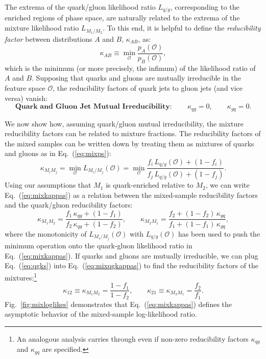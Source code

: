 \documentclass[letterpaper,11pt]{article}
\DeclareRobustCommand{\Fig}[1]{Fig.~\ref{#1}}
\DeclareRobustCommand{\Eq}[1]{Eq.~(\ref{#1})}
\renewcommand{\O}{\mathcal{O}}
\begin{document}
The extrema of the quark/gluon likelihood ratio $L_{q/g}$, corresponding to the enriched regions of phase space, are naturally related to the extrema of the mixture likelihood ratio $L_{M_1/M_2}$.
%
To this end, it is helpful to define the \emph{reducibility factor} between distributions $A$ and $B$, $\kappa_{AB}$, as:
\begin{equation}
\label{eq:kappa}
\kappa_{AB}\equiv\min_{\O}\frac{p_A(\O)}{p_B(\O)},
\end{equation}
which is the minimum (or more precisely, the infimum) of the likelihood ratio of $A$ and $B$.
%
Supposing that quarks and gluons are mutually irreducible in the feature space $\O$, the reducibility factors of quark jets to gluon jets (and vice versa) vanish:
\begin{equation}
\label{eq:qgks}
\textbf{Quark and Gluon Jet Mutual Irreducibility}:\quad\quad\kappa_{qg}=0,\quad\quad\kappa_{gq}=0.
\end{equation}

We now show how, assuming quark/gluon mutual irreducibility, the mixture reducibility factors can be related to mixture fractions.
%
The reducibility factors of the mixed samples can be written down by treating them as mixtures of quarks and gluons as in \Eq{eq:mixps}:
\begin{equation}
\label{eq:mixkappas}
\kappa_{M_iM_j}=\min_{\O} L_{M_i/M_j}(\O)=\min_{\O}\frac{f_i \, L_{q/g}(\O)+(1-f_i)}{f_j \, L_{q/g}(\O)+(1-f_j)}.
\end{equation}
%
Using our assumptions that $M_1$ is quark-enriched relative to $M_2$, we can write \Eq{eq:mixkappas} as a relation between the mixed-sample reducibility factors and the quark/gluon reducibility factors:
\begin{equation}
\label{eq:mixqgkappas}
\kappa_{M_1M_2}=\frac{f_1\,\kappa_{qg}+(1-f_1)}{f_2\,\kappa_{qg}+(1-f_2)},\quad\quad \kappa_{M_2M_1}=\frac{f_2+(1-f_2)\, \kappa_{gq}}{f_1+(1-f_1)\, \kappa_{gq}},
\end{equation}
where the monotonicity of $L_{M_i/M_j}(\O)$ with $L_{q/g}(\O)$ has been used to push the minimum operation onto the quark-gluon likelihood ratio in \Eq{eq:mixkappas}.
%
If quarks and gluons are mutually irreducible, we can plug \Eq{eq:qgks} into \Eq{eq:mixqgkappas} to find the reducibility factors of the mixtures:\footnote{An analogous analysis carries through even if non-zero reducibility factors $\kappa_{qg}$ and $\kappa_{gq}$ are specified.}
\begin{equation}
\label{eq:kfs}
\kappa_{12}\equiv\kappa_{M_1M_2}=\frac{1-f_1}{1-f_2},\quad\quad\kappa_{21}\equiv\kappa_{M_2M_1}=\frac{f_2}{f_1}.
\end{equation}
%
\Fig{fig:mixloglikes} demonstrates that \Eq{eq:mixkappas} defines the asymptotic behavior of the mixed-sample log-likelihood ratio.
\end{document}

